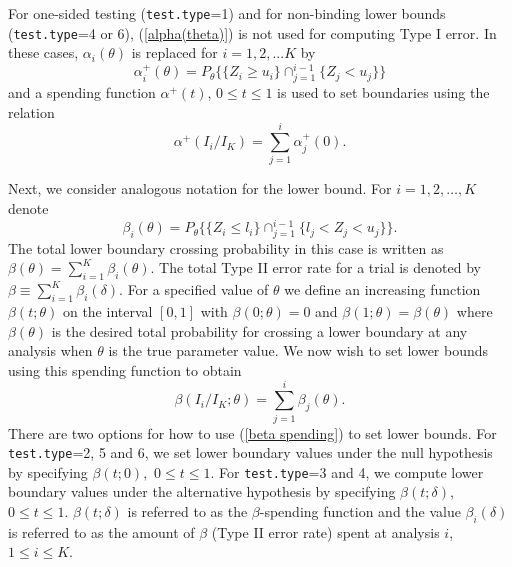 For one-sided testing (\texttt{test.type}=1) and for non-binding lower bounds
(\texttt{test.type}=4 or 6), (\ref{alpha(theta)}) is not used for computing
Type I error. In these cases, $\alpha_{i}(\theta)$ is replaced for
$i=1,2,...K$ by
\begin{equation}
\alpha_{i}^{+}(\theta)=P_{\theta}\{\{Z_{i}\geq u_{i}\}\cap_{j=1}^{i-1}%
\{Z_{j}<u_{j}\}\}\label{alpha+(theta)}%
\end{equation}
and a spending function $\alpha^{+}(t)$, $0\leq t\leq1$ is used to set
boundaries using the relation%
\begin{equation}
\alpha^{+}(I_{i}/I_{K})=\sum_{j=1}^{i}\alpha_{j}^{+}%
(0).\label{alpha+ spending}%
\end{equation}


Next, we consider analogous notation for the lower bound. For $i=1,2,\ldots,K$
denote
\begin{equation}
\beta_{i}(\theta)=P_{\theta}\{\{Z_{i}\leq l_{i}\}\cap_{j=1}^{i-1}\{l_{j}%
<Z_{j}<u_{j}\}\}.\label{beta(theta)}%
\end{equation}
The total lower boundary crossing probability in this case is written as
$\beta(\theta)=%
{\textstyle\sum\limits_{i=1}^{K}}
\beta_{i}(\theta).$ The total Type II error rate for a trial is denoted
by $\beta\equiv\sum_{i=1}^{K}\beta_{i}(\delta)$. For a specified value of
$\theta$ we define an increasing function $\beta(t;\theta)$ on the interval
$[0,1]$ with $\beta(0;\theta)=0$ and $\beta(1;\theta)=\beta(\theta)$ where
$\beta(\theta)$ is the desired total probability for crossing a lower boundary
at any analysis when $\theta$ is the true parameter value. We now wish to set
lower bounds using this spending function to obtain%
\begin{equation}
\beta(I_{i}/I_{K};\theta)=\sum_{j=1}^{i}\beta_{j}(\theta
).\label{beta spending}%
\end{equation}
There are two options for how to use (\ref{beta spending}) to set lower
bounds. For \texttt{test.type}=2, 5 and 6, we set lower boundary values under
the null hypothesis by specifying $\beta(t;0),$ $0\leq t\leq1$. For
\texttt{test.type}=3 and 4, we compute lower boundary values under the
alternative hypothesis by specifying $\beta(t;\delta)$, $0\leq t\leq1$.
$\beta(t;\delta)$ is referred to as the $\beta$-spending function and the
value $\beta_{i}(\delta)$ is referred to as the amount of $\beta$ (Type
II error rate) spent at analysis $i$, $1\leq i\leq K$.

